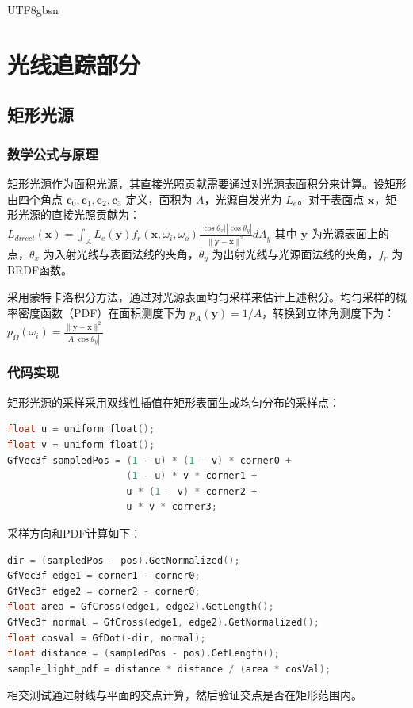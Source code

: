 \documentclass[10pt,a4paper,twocolumn]{article}
\begin{document}
\begin{CJK*}{UTF8}{gbsn}
\section{光线追踪部分}
\subsection{矩形光源}
\subsubsection{数学公式与原理}
矩形光源作为面积光源，其直接光照贡献需要通过对光源表面积分来计算。设矩形由四个角点 $\mathbf{c}_0, \mathbf{c}_1, \mathbf{c}_2, \mathbf{c}_3$ 定义，面积为 $A$，光源自发光为 $L_e$。对于表面点 $\mathbf{x}$，矩形光源的直接光照贡献为：
$
L_{direct}(\mathbf{x}) = \int_A L_e(\mathbf{y}) f_r(\mathbf{x}, \omega_i, \omega_o) \frac{|\cos\theta_x| |\cos\theta_y|}{\|\mathbf{y} - \mathbf{x}\|^2} dA_y
$
其中 $\mathbf{y}$ 为光源表面上的点，$\theta_x$ 为入射光线与表面法线的夹角，$\theta_y$ 为出射光线与光源面法线的夹角，$f_r$ 为BRDF函数。

采用蒙特卡洛积分方法，通过对光源表面均匀采样来估计上述积分。均匀采样的概率密度函数（PDF）在面积测度下为 $p_A(\mathbf{y}) = 1/A$，转换到立体角测度下为：
$
p_{\Omega}(\omega_i) = \frac{\|\mathbf{y} - \mathbf{x}\|^2}{A |\cos\theta_y|}
$ 
\subsubsection{代码实现}
矩形光源的采样采用双线性插值在矩形表面生成均匀分布的采样点：
\begin{lstlisting}[language=C++, caption={Rectangular light uniform sampling}]
float u = uniform_float();
float v = uniform_float();
GfVec3f sampledPos = (1 - u) * (1 - v) * corner0 + 
                     (1 - u) * v * corner1 + 
                     u * (1 - v) * corner2 + 
                     u * v * corner3;
\end{lstlisting}
采样方向和PDF计算如下：
\begin{lstlisting}[language=C++, caption={Rectangular light PDF calculation}]
dir = (sampledPos - pos).GetNormalized();
GfVec3f edge1 = corner1 - corner0;
GfVec3f edge2 = corner2 - corner0;
float area = GfCross(edge1, edge2).GetLength();
GfVec3f normal = GfCross(edge1, edge2).GetNormalized();
float cosVal = GfDot(-dir, normal);
float distance = (sampledPos - pos).GetLength();
sample_light_pdf = distance * distance / (area * cosVal);
\end{lstlisting}
相交测试通过射线与平面的交点计算，然后验证交点是否在矩形范围内。

\end{CJK*}
\end{document}
